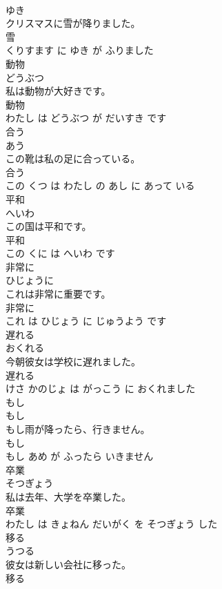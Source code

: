 \documentclass[8pt]{extreport}
\begin{document}
\begin{CJK}{UTF8}{min}
\\	ゆき			
\\	クリスマスに雪が降りました。	
\\	雪 
\\	くりすます に ゆき が ふりました			
\\	動物	
\\	どうぶつ			
\\	私は動物が大好きです。	
\\	動物 
\\	わたし は どうぶつ が だいすき です			
\\	合う	
\\	あう			
\\	この靴は私の足に合っている。	
\\	合う 
\\	この くつ は わたし の あし に あって いる			
\\	平和	
\\	へいわ			
\\	この国は平和です。	
\\	平和 
\\	この くに は へいわ です			
\\	非常に	
\\	ひじょうに			
\\	これは非常に重要です。	
\\	非常に 
\\	これ は ひじょう に じゅうよう です			
\\	遅れる	
\\	おくれる			
\\	今朝彼女は学校に遅れました。	
\\	遅れる 
\\	けさ かのじょ は がっこう に おくれました			
\\	もし	
\\	もし			
\\	もし雨が降ったら、行きません。	
\\	もし 
\\	もし あめ が ふったら いきません			
\\	卒業	
\\	そつぎょう			
\\	私は去年、大学を卒業した。	
\\	卒業 
\\	わたし は きょねん だいがく を そつぎょう した			
\\	移る	
\\	うつる			
\\	彼女は新しい会社に移った。	
\\	移る 

\end{CJK}
\end{document}
